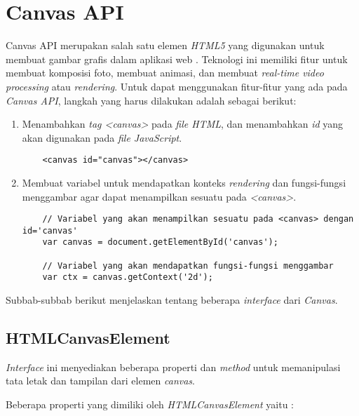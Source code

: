 \section{Canvas API}
\label{sec:Canvas API}
 
Canvas API merupakan salah satu elemen \textit{HTML5} yang digunakan untuk membuat gambar grafis dalam aplikasi web \cite{canvas}. Teknologi ini memiliki fitur untuk membuat komposisi foto, membuat animasi, dan membuat \textit{real-time video processing} atau \textit{rendering}. Untuk dapat menggunakan fitur-fitur yang ada pada \textit{Canvas API}, langkah yang harus dilakukan adalah sebagai berikut:
\begin{enumerate}
	\item Menambahkan \textit{tag <canvas>} pada \textit{file HTML}, dan menambahkan \textit{id} yang akan digunakan pada \textit{file JavaScript}.
	\begin{lstlisting}
	<canvas id="canvas"></canvas>
	\end{lstlisting}
	
	\item Membuat variabel untuk mendapatkan konteks \textit{rendering} dan fungsi-fungsi menggambar agar dapat menampilkan sesuatu pada \textit{<canvas>}.
	\begin{lstlisting}
	// Variabel yang akan menampilkan sesuatu pada <canvas> dengan id='canvas'
	var canvas = document.getElementById('canvas'); 
	
	// Variabel yang akan mendapatkan fungsi-fungsi menggambar 
	var ctx = canvas.getContext('2d');
	\end{lstlisting}
\end{enumerate}

Subbab-subbab berikut menjelaskan tentang beberapa \textit{interface} dari \textit{Canvas}.

\subsection{HTMLCanvasElement}
\textit{Interface} ini menyediakan beberapa properti dan \textit{method} untuk memanipulasi tata letak dan tampilan dari elemen \textit{canvas}.

Beberapa properti yang dimiliki oleh \textit{HTMLCanvasElement} yaitu : 

